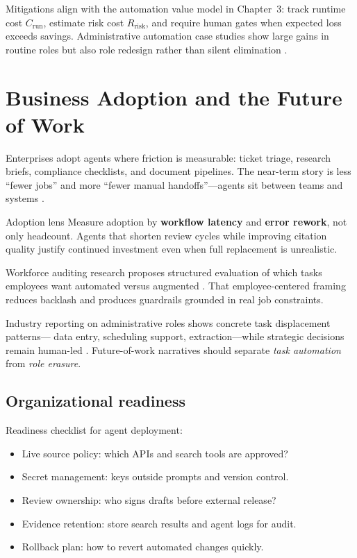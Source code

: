Mitigations align with the automation value model in Chapter~3: track runtime cost
$C_{\mathrm{run}}$, estimate risk cost $R_{\mathrm{risk}}$, and require human gates when
expected loss exceeds savings. Administrative automation case studies show large gains in
routine roles but also role redesign rather than silent elimination
\cite{recomaijobroles}.

\section{Business Adoption and the Future of Work}
\label{sec:business-adoption}

Enterprises adopt agents where friction is measurable: ticket triage, research briefs,
compliance checklists, and document pipelines. The near-term story is less ``fewer jobs''
and more ``fewer manual handoffs''---agents sit between teams and systems
\cite{mediumworkflowagents}.

\begin{insightbox}{Adoption lens}
Measure adoption by \textbf{workflow latency} and \textbf{error rework}, not only headcount.
Agents that shorten review cycles while improving citation quality justify continued
investment even when full replacement is unrealistic.
\end{insightbox}

Workforce auditing research proposes structured evaluation of which tasks employees want
automated versus augmented \cite{arxiv2506workagents}. That employee-centered framing
reduces backlash and produces guardrails grounded in real job constraints.

Industry reporting on administrative roles shows concrete task displacement patterns---
data entry, scheduling support, extraction---while strategic decisions remain human-led
\cite{recomaijobroles}. Future-of-work narratives should separate \emph{task automation}
from \emph{role erasure}.

\subsection{Organizational readiness}
Readiness checklist for agent deployment:
\begin{itemize}
  \item Live source policy: which APIs and search tools are approved?
  \item Secret management: keys outside prompts and version control.
  \item Review ownership: who signs drafts before external release?
  \item Evidence retention: store search results and agent logs for audit.
  \item Rollback plan: how to revert automated changes quickly.
\end{itemize}

